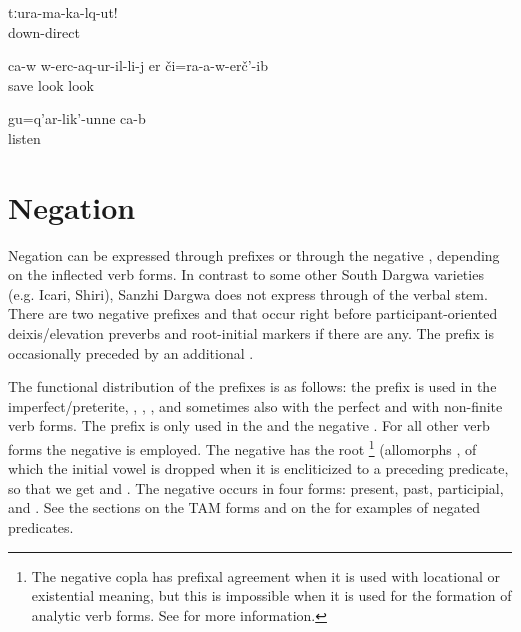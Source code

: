 \begin{exe}
	\ex	\label{ex:Do not go out (of the car) (said to a man) verbs}
	\gll	tːura-ma-ka-lq-ut!\\
		down-direct\\
	\glt	{}

	\ex	\label{ex:He did not even look at his savior verbs}
	\gll	ca-w	w-erc-aq-ur-il-li-j	er či=ra-a-w-erč'-ib\\
			save	look look\\
	\glt	{}

	\ex	\label{ex:As for listening, s/he is listening verbs}
	\gll	gu=q'ar-lik'-unne	ca-b\\
		listen	\\
	\glt	{}
\end{exe}



\section{Negation}
\label{sec:Negation}

Negation can be expressed through prefixes or through the negative , depending on the inflected verb forms. In contrast to some other South Dargwa varieties (e.g. Icari, Shiri), Sanzhi Dargwa does not express  through  of the verbal stem. There are two negative prefixes  and  that occur right before participant-oriented deixis/elevation preverbs and root-initial  markers if there are any. The prefix  is occasionally preceded by an additional  .

The functional distribution of the  prefixes is as follows: the prefix  is used in the imperfect/preterite, , , , and sometimes also with the perfect and with non-finite verb forms. The prefix  is only used in the  and the negative . For all other verb forms the negative  is employed. The negative  has the root \footnote{The negative copla has prefixal  agreement when it is used with locational or existential meaning, but this is impossible when it is used for the formation of analytic verb forms. See  for more information.} (allomorphs , of which the initial vowel is dropped when it is encliticized to a preceding predicate, so that we get  and . The negative  occurs in four forms: present, past, participial, and . See the sections on the TAM forms and  on the  for examples of negated predicates.



